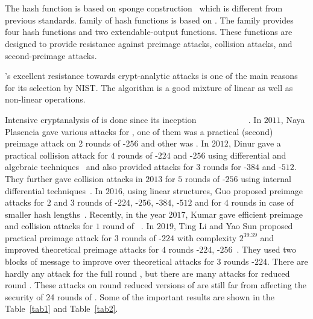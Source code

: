\section{\KECCAK{}}

The \KECCAK{} hash function is based on sponge construction~\cite{bertoni2011cryptographic} which is different from previous \SHA{} standards.  family of hash functions is based on \Keccak{}. The  family provides four hash functions and two extendable-output functions. These functions are designed to provide resistance against preimage attacks, collision attacks, and second-preimage attacks.

\Keccak{}'s excellent resistance towards crypt-analytic attacks is one of the main reasons for its selection by NIST. The algorithm is a good mixture of linear as well as non-linear operations.

Intensive cryptanalysis of \KECCAK{} is done since its inception ~\cite{bernstein2010second}~\cite{naya2011practical}~\cite{dinur2012new}~\cite{dinur2013collision}~\cite{morawiecki2013sat}
~\cite{dinur2014improved}~\cite{chang20141st}~\cite{guo2016linear}~\cite{qiao2017new}~\cite{song2017non}~\cite{kumar2018cryptanalysis}. In $2011$, Naya Plasencia \etal gave various attacks for \KECCAK{}, one of them was a practical (second) preimage attack on 2 rounds of \KECCAK-$256$ and other was . In $2012$, Dinur \etal gave a practical collision attack for $4$ rounds of \KECCAK-$224$ and \KECCAK-$256$ using differential and algebraic techniques~\cite{dinur2012new} and also provided attacks for $3$ rounds for \KECCAK-$384$ and \KECCAK-$512$. They further gave collision attacks in $2013$ for $5$ rounds of \KECCAK-$256$ using internal differential techniques~\cite{dinur2013collision}. In $2016$, using linear structures, Guo \etal proposed preimage attacks for $2$ and $3$ rounds of \KECCAK-$224$, \KECCAK-$256$, \KECCAK-$384$, \KECCAK-$512$ and for $4$ rounds in case of smaller hash lengths~\cite{guo2016linear}. Recently, in the year $2017$, Kumar \etal gave efficient preimage and collision attacks for $1$ round of \KECCAK~\cite{kumar2018cryptanalysis}. In $2019$, Ting Li and Yao Sun proposed practical preimage attack for $3$ rounds of \KECCAK-$224$ with complexity $2^{39.39}$ and improved theoretical preimage attacks for $4$ rounds \KECCAK-$224$, \KECCAK-$256$~\cite{lipreimage}. They used two blocks of message to improve over theoretical attacks for $3$ rounds \KECCAK-$224$. There are hardly any attack for the full round \KECCAK{}, but there are many attacks for reduced round \Keccak{}. These attacks on round reduced versions of \KECCAK{} are still far from affecting the security of 24 rounds of \KECCAK{}. Some of the important results are shown in the Table~\ref{tab1} and Table~\ref{tab2}.

